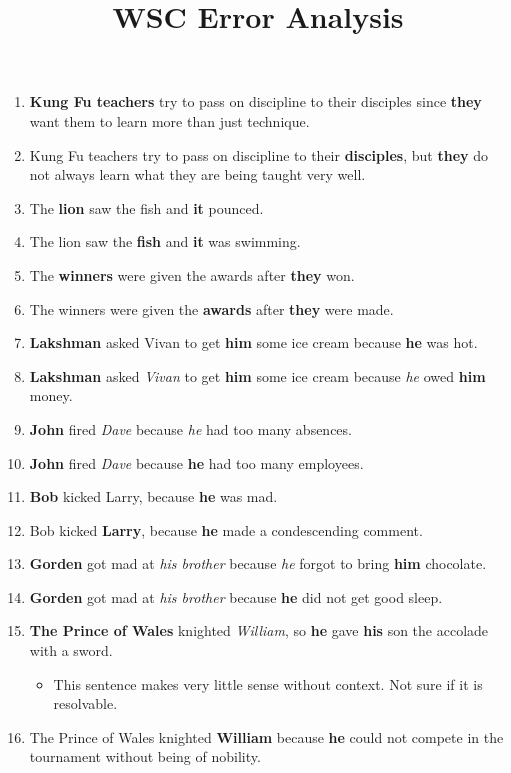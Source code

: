 \documentclass{article}
\begin{document}
\title{WSC Error Analysis}
\maketitle

\begin{enumerate}
	\item {\bf Kung Fu teachers} try to pass on discipline to their disciples since {\bf they} want them to learn more than just technique.
	\item Kung Fu teachers try to pass on discipline to their {\bf disciples}, but {\bf they} do not always learn what they are being taught very well.
	\item The {\bf lion} saw the fish and {\bf it} pounced.
	\item The lion saw the {\bf fish} and {\bf it} was swimming.
	\item The {\bf winners} were given the awards after {\bf they} won.
	\item The winners were given the {\bf awards} after {\bf they} were made.
	\item {\bf Lakshman} asked Vivan to get {\bf him} some ice cream because {\bf he} was hot.
	\item {\bf Lakshman} asked {\it Vivan} to get {\bf him} some ice cream because {\it he} owed {\bf him} money.
	\item {\bf John} fired {\it Dave} because {\it he} had too many absences.
	\item {\bf John} fired {\it Dave} because {\bf he} had too many employees.
	\item {\bf Bob} kicked Larry, because {\bf he} was mad.
	\item Bob kicked {\bf Larry}, because {\bf he} made a condescending comment.
	\item {\bf Gorden} got mad at {\it his brother} because {\it he} forgot to bring {\bf him} chocolate.
	\item {\bf Gorden} got mad at {\it his brother} because {\bf he} did not get good sleep.
	\item {\bf The Prince of Wales} knighted {\it William}, so {\bf he} gave {\bf his} son the accolade with a sword.
		\begin{itemize}
			\item This sentence makes very little sense without context. Not sure if it is resolvable.
		\end{itemize}
	\item The Prince of Wales knighted {\bf William} because {\bf he} could not compete in the tournament without being of nobility.

\end{enumerate}
\end{document}
